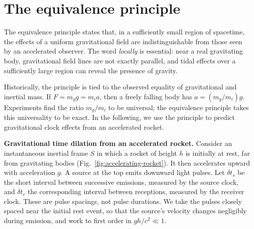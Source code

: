 \documentclass[12pt]{article}
\begin{document}
\section{The equivalence principle}\label{sec:EP}
The equivalence principle states that, in a sufficiently small region of spacetime, the effects of a uniform gravitational field are indistinguishable from those seen by an accelerated observer. The word \emph{locally} is essential: near a real gravitating body, gravitational field lines are not exactly parallel, and tidal effects over a sufficiently large region can reveal the presence of gravity.

Historically, the principle is tied to the observed equality of gravitational and inertial mass. If $F=m_g g=m_i a$, then a freely falling body has $a=(m_g/m_i)g$. Experiments find the ratio $m_g/m_i$ to be universal; the equivalence principle takes this universality to be exact. In the following, we use the principle to predict gravitational clock effects from an accelerated rocket.

\noindent 
{\bf Gravitational time dilation from an accelerated rocket.} Consider an instantaneous inertial frame $S$ in which a rocket of height $h$ is initially at rest, far from gravitating bodies (Fig.~\ref{fig:accelerating-rocket}). It then accelerates upward with acceleration $g$. A source at the top emits downward light pulses. Let $\delta t_s$ be the short interval between successive emissions, measured by the source clock, and $\delta t_r$ the corresponding interval between receptions, measured by the receiver clock. These are pulse spacings, not pulse durations. We take the pulses closely spaced near the initial rest event, so that the source's velocity changes negligibly during emission, and work to first order in $gh/c^2\ll1$.
\end{document}
